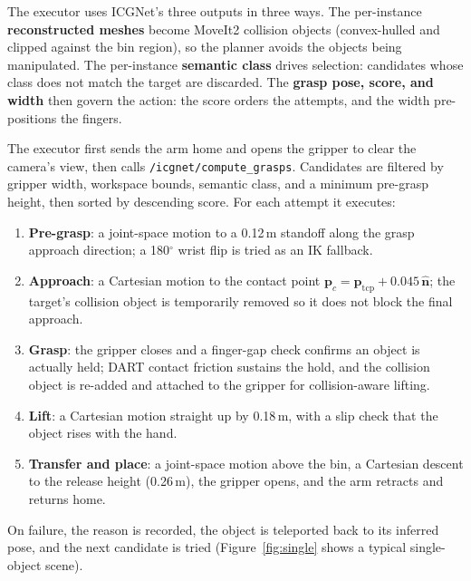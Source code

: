 \documentclass[10pt,twocolumn,letterpaper]{article}
\begin{document}
The executor uses ICGNet's three outputs in three ways. The per-instance \textbf{reconstructed
meshes} become MoveIt2 collision objects (convex-hulled and clipped against the bin region), so the
planner avoids the objects being manipulated. The per-instance \textbf{semantic class} drives
selection: candidates whose class does not match the target are discarded. The \textbf{grasp pose,
score, and width} then govern the action: the score orders the attempts, and the width pre-positions
the fingers.

The executor first sends the arm home and opens the gripper to clear the camera's view, then calls
\texttt{/icgnet/compute\_grasps}. Candidates are filtered by gripper width, workspace
bounds, semantic class, and a minimum pre-grasp height, then sorted by descending score. For each attempt it executes:

\begin{enumerate}[noitemsep, topsep=2pt, leftmargin=*]
  \item \textbf{Pre-grasp}: a joint-space motion to a 0.12\,m standoff along the grasp approach
        direction; a 180$^{\circ}$ wrist flip is tried as an IK fallback.
  \item \textbf{Approach}: a Cartesian motion to the contact point
        $\mathbf{p}_c=\mathbf{p}_{\mathrm{tcp}}+0.045\,\hat{\mathbf{n}}$; the target's collision object
        is temporarily removed so it does not block the final approach.
  \item \textbf{Grasp}: the gripper closes and a finger-gap check confirms an object is
        actually held; DART contact friction sustains the hold, and the collision object is re-added
        and attached to the gripper for collision-aware lifting.
  \item \textbf{Lift}: a Cartesian motion straight up by 0.18\,m, with a slip check that the object
        rises with the hand.
  \item \textbf{Transfer and place}: a joint-space motion above the bin, a Cartesian descent to the
        release height (0.26\,m), the gripper opens, and the arm retracts and returns home.
\end{enumerate}

\noindent
On failure, the reason is recorded, the object is teleported back to its inferred pose, and the next
candidate is tried (Figure~\ref{fig:single} shows a typical single-object scene).
\end{document}
